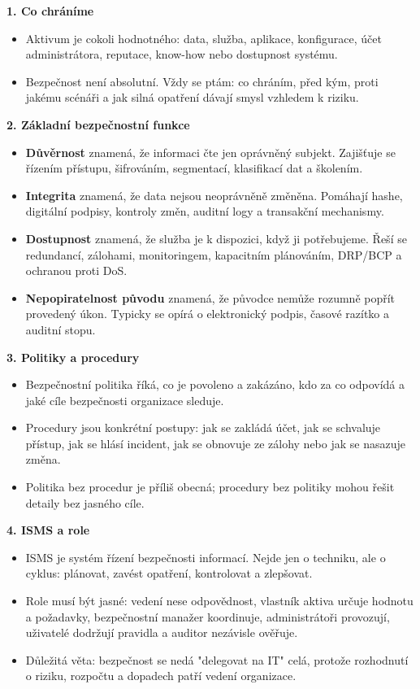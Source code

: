 \documentclass[11pt,a4paper]{article}
\begin{document}
\textbf{1. Co chráníme}
\begin{itemize}
  \item Aktivum je cokoli hodnotného: data, služba, aplikace, konfigurace, účet administrátora, reputace, know-how nebo dostupnost systému.
  \item Bezpečnost není absolutní. Vždy se ptám: co chráním, před kým, proti jakému scénáři a jak silná opatření dávají smysl vzhledem k riziku.
\end{itemize}

\textbf{2. Základní bezpečnostní funkce}
\begin{itemize}
  \item \textbf{Důvěrnost} znamená, že informaci čte jen oprávněný subjekt. Zajišťuje se řízením přístupu, šifrováním, segmentací, klasifikací dat a školením.
  \item \textbf{Integrita} znamená, že data nejsou neoprávněně změněna. Pomáhají hashe, digitální podpisy, kontroly změn, auditní logy a transakční mechanismy.
  \item \textbf{Dostupnost} znamená, že služba je k dispozici, když ji potřebujeme. Řeší se redundancí, zálohami, monitoringem, kapacitním plánováním, DRP/BCP a ochranou proti DoS.
  \item \textbf{Nepopiratelnost původu} znamená, že původce nemůže rozumně popřít provedený úkon. Typicky se opírá o elektronický podpis, časové razítko a auditní stopu.
\end{itemize}

\textbf{3. Politiky a procedury}
\begin{itemize}
  \item Bezpečnostní politika říká, co je povoleno a zakázáno, kdo za co odpovídá a jaké cíle bezpečnosti organizace sleduje.
  \item Procedury jsou konkrétní postupy: jak se zakládá účet, jak se schvaluje přístup, jak se hlásí incident, jak se obnovuje ze zálohy nebo jak se nasazuje změna.
  \item Politika bez procedur je příliš obecná; procedury bez politiky mohou řešit detaily bez jasného cíle.
\end{itemize}

\textbf{4. ISMS a role}
\begin{itemize}
  \item ISMS je systém řízení bezpečnosti informací. Nejde jen o techniku, ale o cyklus: plánovat, zavést opatření, kontrolovat a zlepšovat.
  \item Role musí být jasné: vedení nese odpovědnost, vlastník aktiva určuje hodnotu a požadavky, bezpečnostní manažer koordinuje, administrátoři provozují, uživatelé dodržují pravidla a auditor nezávisle ověřuje.
  \item Důležitá věta: bezpečnost se nedá "delegovat na IT" celá, protože rozhodnutí o riziku, rozpočtu a dopadech patří vedení organizace.
\end{itemize}
\end{document}
